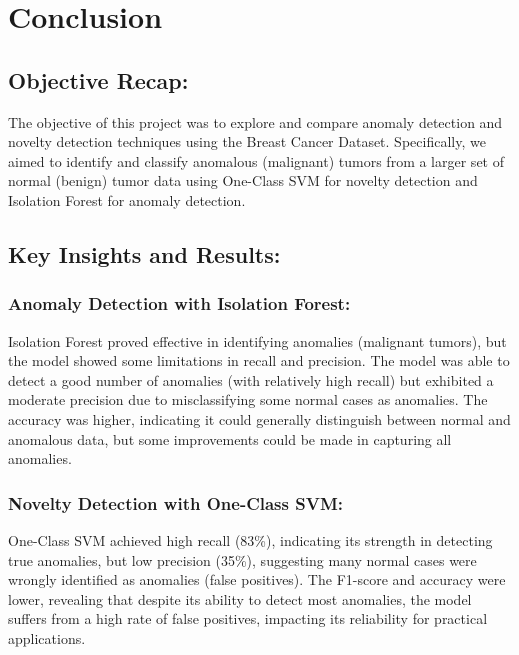 \documentclass[11pt]{article}
\begin{document}
    \section{Conclusion}\label{conclusion}

\subsection{Objective Recap:}\label{objective-recap}

The objective of this project was to explore and compare anomaly
detection and novelty detection techniques using the Breast Cancer
Dataset. Specifically, we aimed to identify and classify anomalous
(malignant) tumors from a larger set of normal (benign) tumor data using
One-Class SVM for novelty detection and Isolation Forest for anomaly
detection.

\subsection{Key Insights and Results:}\label{key-insights-and-results}

\subsubsection{Anomaly Detection with Isolation
Forest:}\label{anomaly-detection-with-isolation-forest}

Isolation Forest proved effective in identifying anomalies (malignant
tumors), but the model showed some limitations in recall and precision.
The model was able to detect a good number of anomalies (with relatively
high recall) but exhibited a moderate precision due to misclassifying
some normal cases as anomalies. The accuracy was higher, indicating it
could generally distinguish between normal and anomalous data, but some
improvements could be made in capturing all anomalies.

\subsubsection{Novelty Detection with One-Class
SVM:}\label{novelty-detection-with-one-class-svm}

One-Class SVM achieved high recall (83\%), indicating its strength in
detecting true anomalies, but low precision (35\%), suggesting many
normal cases were wrongly identified as anomalies (false positives). The
F1-score and accuracy were lower, revealing that despite its ability to
detect most anomalies, the model suffers from a high rate of false
positives, impacting its reliability for practical applications.
\end{document}
